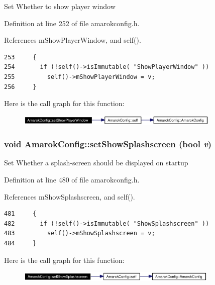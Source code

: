 Set Whether to show player window 

Definition at line 252 of file amarokconfig.h.

References m\-Show\-Player\-Window, and self().



\footnotesize\begin{verbatim}253     {
254       if (!self()->isImmutable( "ShowPlayerWindow" ))
255         self()->mShowPlayerWindow = v;
256     }
\end{verbatim}\normalsize 


Here is the call graph for this function:\begin{figure}[H]
\begin{center}
\leavevmode
\includegraphics[width=275pt]{classAmarokConfig_AmarokConfige25_cgraph}
\end{center}
\end{figure}
\subsubsection{\setlength{\rightskip}{0pt plus 5cm}void Amarok\-Config::set\-Show\-Splashscreen (bool {\em v})\hspace{0.3cm}{\tt  [inline, static]}}\label{classAmarokConfig_AmarokConfige49}


Set Whether a splash-screen should be displayed on startup 

Definition at line 480 of file amarokconfig.h.

References m\-Show\-Splashscreen, and self().



\footnotesize\begin{verbatim}481     {
482       if (!self()->isImmutable( "ShowSplashscreen" ))
483         self()->mShowSplashscreen = v;
484     }
\end{verbatim}\normalsize 


Here is the call graph for this function:\begin{figure}[H]
\begin{center}
\leavevmode
\includegraphics[width=273pt]{classAmarokConfig_AmarokConfige49_cgraph}
\end{center}
\end{figure}
